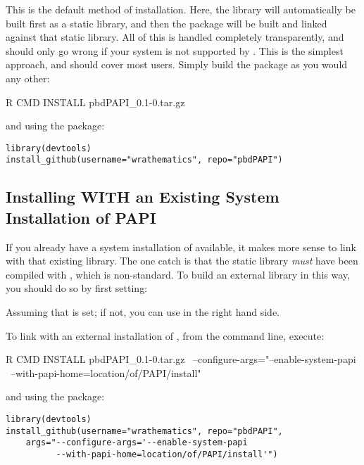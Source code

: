 This is the default method of installation.  Here, the \PAPI library will  
automatically be built first as a static library, and then the \thispackage 
package will be built and linked against that static library.  All of this is 
handled completely transparently, and should only go wrong if your system is not 
supported by \PAPI.  This is the simplest approach, and should cover most users. 
 Simply build the package as you would any other:
\begin{Command}
R CMD INSTALL pbdPAPI_0.1-0.tar.gz
\end{Command}
and using the  package:
\begin{lstlisting}[language=rr]
library(devtools)
install_github(username="wrathematics", repo="pbdPAPI")
\end{lstlisting}




\subsection{Installing WITH an Existing System Installation of PAPI}

If you already have a system installation of \PAPI available, it makes more  
sense to link with that existing library.  The one catch is that the static 
library \emph{must} have been compiled with , which is non-standard. 
 To build an external \PAPI library in this way, you should do so by first 
setting:
Assuming that  is set; if not, you can use  in the right hand 
side.

To link with an external installation of \PAPI, from the command line, execute:
\begin{Command}
R CMD INSTALL pbdPAPI_0.1-0.tar.gz \ 
    --configure-args="--enable-system-papi \ 
    --with-papi-home=location/of/PAPI/install"
\end{Command}
and using the  package:
\begin{lstlisting}
library(devtools)
install_github(username="wrathematics", repo="pbdPAPI", 
    args="--configure-args='--enable-system-papi 
          --with-papi-home=location/of/PAPI/install'")
\end{lstlisting}
